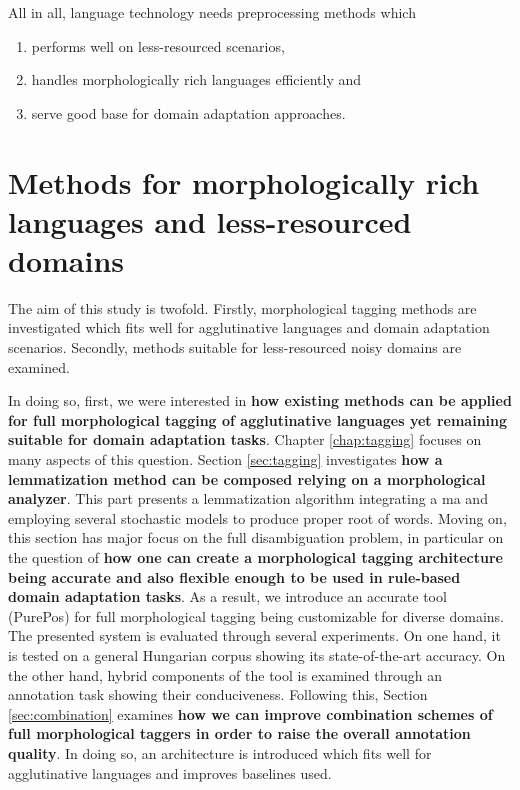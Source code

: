 All in all, language technology needs preprocessing methods which
\begin{enumerate}
\item performs well on less-resourced scenarios,
\item handles morphologically rich languages efficiently and
\item serve good base for domain adaptation approaches.
\end{enumerate}

\section{Methods for morphologically rich languages and less-resourced domains}

The aim of this study is twofold. 
Firstly, morphological tagging methods are investigated which fits well for agglutinative languages and domain adaptation scenarios. 
Secondly, methods suitable for less-resourced noisy domains are examined.

In doing so, first, we were interested in \textbf{how existing methods can be applied for full morphological tagging of agglutinative languages yet remaining suitable for domain adaptation tasks}. 
Chapter \ref{chap:tagging} focuses on many aspects of this question. 
Section \ref{sec:tagging} investigates \textbf{how a lemmatization method can be composed relying on a morphological analyzer}. 
This part presents a lemmatization algorithm integrating a \acrshort{ma} and employing several stochastic models to produce proper root of words.
Moving on, this section has major focus on the full disambiguation problem, in particular on the question of \textbf{how one can create a morphological tagging architecture being accurate and also flexible enough to be used in rule-based domain adaptation tasks}.
As a result, we introduce an accurate tool (PurePos) for full morphological tagging being customizable for diverse domains.
The presented system is evaluated through several experiments. 
On one hand, it is tested on a general Hungarian corpus showing its state-of-the-art accuracy.
On the other hand, hybrid components of the tool is examined through an annotation task showing their conduciveness.
Following this, Section \ref{sec:combination} examines \textbf{how we can improve combination schemes of full morphological taggers in order to raise the overall annotation quality}.
In doing so, an architecture is introduced which fits well for agglutinative languages and improves baselines used.


